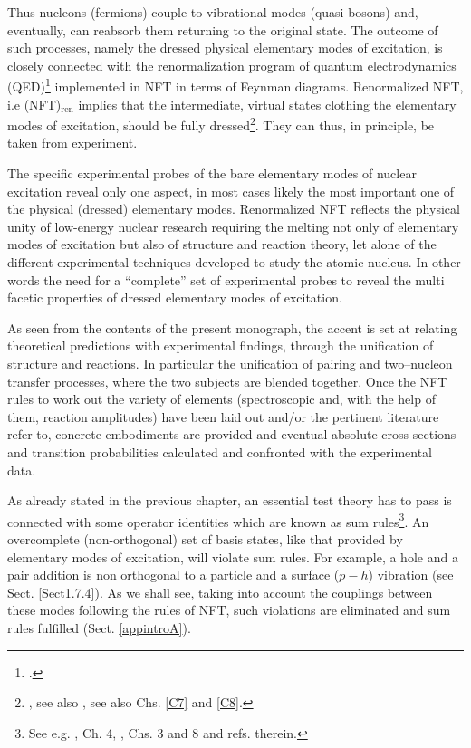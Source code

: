  
 Thus nucleons (fermions)  couple to  vibrational modes (quasi-bosons) and, eventually, can reabsorb them returning to the original state. The outcome of such processes, namely the dressed physical elementary modes of excitation, is closely connected with the renormalization program of quantum electrodynamics (QED)\footnote{\cite{Feynman:75,Schwinger:01}.} implemented in NFT in terms of Feynman diagrams. Renormalized NFT, i.e (NFT)$_{\text{ren}}$ implies that the intermediate, virtual states clothing the elementary modes of excitation, should be fully dressed\footnote{\cite{Barranco:17}, see also \cite{Broglia:16}, see also Chs. \ref{C7} and \ref{C8}.}. They can thus, in principle, be taken from experiment. 
  
 
  The specific experimental probes of the bare elementary modes of nuclear excitation reveal only one aspect, in most cases likely the most important one of the physical (dressed) elementary modes. Renormalized NFT  reflects the physical unity of  low-energy nuclear research requiring the melting not only of elementary modes of excitation but also of structure and reaction theory, let alone of the different experimental techniques developed to study the atomic nucleus. In other words the need for a ``complete'' set of experimental probes to reveal the multi facetic properties of dressed elementary modes of excitation.

As  seen from the contents of the present monograph, the accent is set at relating theoretical predictions with experimental findings, through the unification of structure and reactions. In particular the unification of pairing and two--nucleon transfer processes, where the two subjects are blended together. Once the NFT rules to work out the variety of elements (spectroscopic and, with the help of them, reaction amplitudes) have been laid  out and/or the pertinent literature refer to, concrete embodiments are provided and eventual absolute cross sections and transition probabilities calculated and confronted with the experimental data. 


As already stated in the previous chapter, an essential test theory has to pass is connected  with some operator identities which are known as sum rules\footnote{See e.g. \cite{Bohr:75,Ring:80}, \cite{Bertsch:05} Ch. 4, \cite{Bortignon:98}, Chs. 3 and 8 and refs. therein.}. An overcomplete (non-orthogonal) set of basis states, like that provided by elementary modes of excitation, will violate sum rules. For example, a hole and a pair addition  is non orthogonal to a particle and a surface ($p-h$) vibration (see  Sect. \ref{Sect1.7.4}). As we shall see, taking into account the couplings between these modes following the rules of NFT,   such violations are eliminated and sum rules fulfilled (Sect. \ref{appintroA}).

